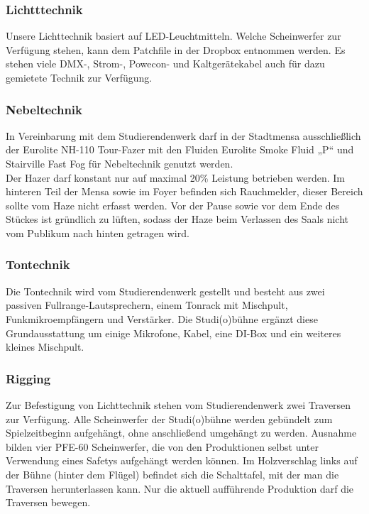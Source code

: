 \subsubsection{Lichtttechnik}
Unsere Lichttechnik basiert auf LED-Leuchtmitteln. Welche Scheinwerfer zur Verfügung stehen, kann dem Patchfile in der Dropbox entnommen werden.	
Es stehen viele DMX-, Strom-, Powecon- und Kaltgerätekabel auch für dazu gemietete Technik zur Verfügung.

\subsubsection{Nebeltechnik}
In Vereinbarung mit dem Studierendenwerk darf in der Stadtmensa ausschließlich der Eurolite NH-110 Tour-Fazer mit den Fluiden Eurolite Smoke Fluid „P“ und Stairville Fast Fog für Nebeltechnik genutzt werden.\\
Der Hazer darf konstant nur auf maximal 20\% Leistung betrieben werden. Im hinteren Teil der Mensa sowie im Foyer befinden sich Rauchmelder, dieser Bereich sollte vom Haze nicht erfasst werden. Vor der Pause sowie vor dem Ende des Stückes ist gründlich zu lüften, sodass der Haze beim Verlassen des Saals nicht vom Publikum nach hinten getragen wird.	

\subsubsection{Tontechnik}
Die Tontechnik wird vom Studierendenwerk gestellt und besteht aus zwei passiven Fullrange-Lautsprechern, einem Tonrack mit Mischpult, Funkmikroempfängern und Verstärker.	
Die Studi(o)bühne ergänzt diese Grundausstattung um einige Mikrofone, Kabel, eine DI-Box und ein weiteres kleines Mischpult. 	

\subsubsection{Rigging}
Zur Befestigung von Lichttechnik stehen vom Studierendenwerk zwei Traversen zur Verfügung. Alle Scheinwerfer der Studi(o)bühne werden gebündelt zum Spielzeitbeginn aufgehängt, ohne anschließend umgehängt zu werden.	
Ausnahme bilden vier PFE-60 Scheinwerfer, die von den Produktionen selbst unter Verwendung eines Safetys aufgehängt werden können.
Im Holzverschlag links auf der Bühne (hinter dem Flügel) befindet sich die Schalttafel, mit der man die Traversen herunterlassen kann. Nur die aktuell aufführende Produktion darf die Traversen bewegen.	

